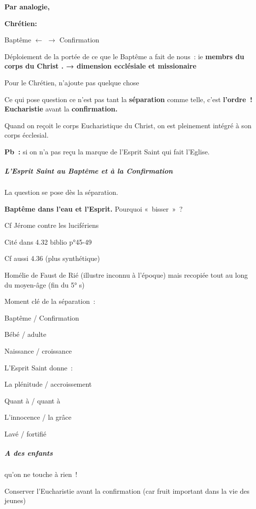 \textbf{Par analogie,}

\textbf{Chrétien:}

Baptême $\leftarrow$ $\rightarrow$ Confirmation

Déploiement de la portée de ce que le Baptême a fait de nous~: ie
\textbf{membrs du corps du Christ . → dimension ecclésiale et
missionaire}

Pour le Chrétien, n'ajoute pas quelque chose

Ce qui pose question ce n'est pas tant la \textbf{séparation} comme
telle, c'est \textbf{l'ordre~! Eucharistie} avant la
\textbf{confirmation.}

Quand on reçoit le corps Eucharistique du Christ, on est pleinement
intégré à son corps écclesial.

\textbf{Pb~:} si on n'a pas reçu la marque de l'Esprit Saint qui fait
l'Eglise.

\hypertarget{b.-lesprit-saint-au-baptuxeame-et-uxe0-la-confirmation}{%
\subparagraph{L'Esprit Saint au Baptême et à la
Confirmation}\label{b.-lesprit-saint-au-baptuxeame-et-uxe0-la-confirmation}}

La question se pose dès la séparation.

\textbf{Baptême dans l'eau et l'Esprit.} Pourquoi «~bisser~»~?

Cf Jérome contre les lucifériens

Cité dans 4.32 biblio p°45-49

Cf aussi 4.36 (plus synthétique)

Homélie de Faust de Rié (illustre inconnu à l'époque) mais recopiée tout
au long du moyen-âge (fin du 5° s)

Moment clé de la séparation~:

Baptême / Confirmation

Bébé / adulte

Naissance / croissance

L'Esprit Saint donne~:

La plénitude / accroissement

Quant à / quant à

L'innocence / la grâce

Lavé / fortifié

\hypertarget{b.-a-des-enfants}{%
\subparagraph{A des enfants}\label{b.-a-des-enfants}}

qu'on ne touche à rien~!

Conserver l'Eucharistie avant la confirmation (car fruit important dans
la vie des jeunes)

